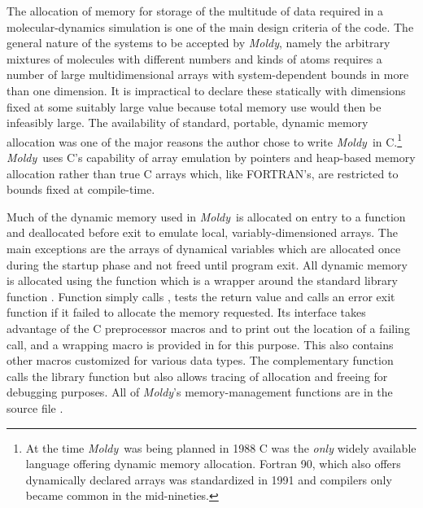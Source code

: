 \documentclass[a4paper,twoside]{report}
\newcommand{\moldy}{\emph{Moldy}}
\begin{document}
The allocation of memory for storage of the multitude of data required
in a molecular-dynamics simulation is one of the main design criteria
of the code. The general nature of the systems to be accepted by
\moldy, namely the arbitrary mixtures of molecules with different
numbers and kinds of atoms requires a number of large multidimensional
arrays with system-dependent bounds in more than one dimension.  It is
impractical to declare these statically with dimensions fixed at some
suitably large value because total memory use would then be infeasibly
large.  The availability of standard, portable, dynamic memory
allocation was one of the major reasons the author chose to write
\moldy\ in C.\footnote{At the time \moldy\ was being planned in 1988 C
  was the \emph{only} widely available language offering dynamic
  memory allocation.  Fortran 90, which also offers dynamically
  declared arrays was standardized in 1991 and compilers only became
  common in the mid-nineties.} \moldy\ uses C's capability of array
emulation by pointers and heap-based memory
allocation\cite{kernighan:88} rather than true C arrays which, like
FORTRAN's, are restricted to bounds fixed at compile-time.

Much of the dynamic memory used in \moldy\ is allocated on entry to a
function and deallocated before exit to emulate local,
variably-dimensioned arrays.  The main exceptions are the arrays of
dynamical variables which are allocated once during the startup phase
and not freed until program exit.  All dynamic memory is allocated
using the function  which is a wrapper around the
standard library function .  Function 
simply calls , tests the return value and calls an error
exit function if it failed to allocate the memory requested.  Its
interface takes advantage of the C preprocessor macros
 and  to print out the location of
a failing call, and a wrapping macro  is provided in
 for this purpose. This also contains other
 macros customized for various data types.  The
complementary function  calls the library function
 but also allows tracing of allocation and freeing for
debugging purposes.  All of \moldy's memory-management functions are
in the source file .
\end{document}
